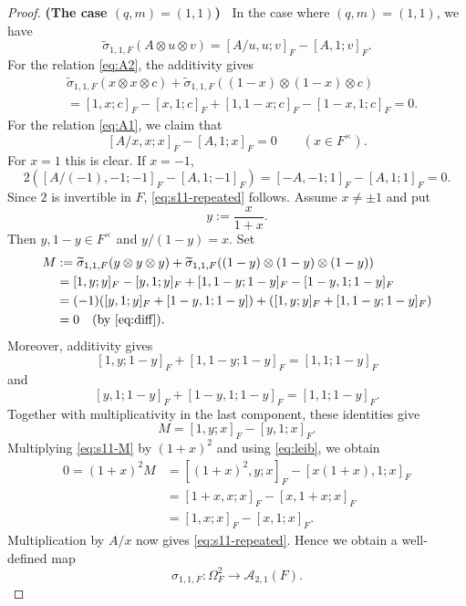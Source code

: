 \documentclass[a4paper,12pt,reqno]{amsart}
\numberwithin{equation}{section}
\theoremstyle{definition}
\newcommand{\Acal}{\mathcal{A}}
\begin{document}
\begin{proof}
\smallskip
\noindent
\textbf{(The case $(q,m)=(1,1)$)\ }
In the case where $(q,m) = (1,1)$, we have 
\begin{equation}\label{eq:s11-tilde}
 \widetilde \sigma_{1,1,F}(A\otimes u\otimes v)
 =[A/u,u;v]_F-[A,1;v]_F.
\end{equation}
For the relation \eqref{eq:A2}, the additivity gives
\begin{align*}
&\widetilde \sigma_{1,1,F}(x\otimes x\otimes c)
 +\widetilde \sigma_{1,1,F}((1-x)\otimes(1-x)\otimes c)\\
&=[1,x;c]_F-[x,1;c]_F+[1,1-x;c]_F-[1-x,1;c]_F=0.
\end{align*}
For the relation \eqref{eq:A1}, 
we claim that
\begin{equation}\label{eq:s11-repeated}
 [A/x,x;x]_F-[A,1;x]_F=0
 \qquad(x\in F^\times).
\end{equation}
For $x=1$ this is clear.  
If $x = -1$, 
\[
2([A/(-1),-1;-1]_F - [A,1;-1]_F) = 
[-A,-1;1]_F - [A,1;1]_F = 0.
\] 
Since $2$ is invertible in $F$,
\eqref{eq:s11-repeated} follows.
Assume $x\neq\pm1$ and put
\[
 y:=\frac{x}{1+x}.
\]
Then $y,1-y\in F^\times$ and $y/(1-y)=x$.  Set
\begin{align*}
 M&:= \widetilde \sigma_{1,1,F}(y\otimes y\otimes y)
 +\widetilde \sigma_{1,1,F}((1-y)\otimes(1-y)\otimes(1-y))\\
&= [1,y;y]_F-[y,1;y]_F
 +[1,1-y;1-y]_F-[1-y,1;1-y]_F\\ 
&= (-1)([y,1;y]_F+[1-y,1;1-y]) + ([1,y;y]_F + [1,1-y;1-y]_F) \\
&= 0 \quad (\mbox{by \eqref{eq:diff}}).
\end{align*}
Moreover, additivity gives 
\[
 [1,y;1-y]_F+[1,1-y;1-y]_F=[1,1;1-y]_F
\]
and
\[
 [y,1;1-y]_F+[1-y,1;1-y]_F=[1,1;1-y]_F.
\]
Together with multiplicativity in the last component, these identities give
\begin{equation}\label{eq:s11-M}
 M=[1,y;x]_F-[y,1;x]_F.
\end{equation}
Multiplying \eqref{eq:s11-M} by $(1+x)^2$ and using \eqref{eq:leib},
we obtain
\begin{align*}
0=(1+x)^2M
&=[(1+x)^2,y;x]_F-[x(1+x),1;x]_F\\
&=[1+x,x;x]_F-[x,1+x;x]_F\\
&=[1,x;x]_F-[x,1;x]_F.
\end{align*}
Multiplication by $A/x$ now gives \eqref{eq:s11-repeated}.  Hence
we obtain a well-defined map
\[
 \sigma_{1,1,F}:\Omega_F^2\to\Acal_{2,1}(F).
\]


\end{proof}
\end{document}
